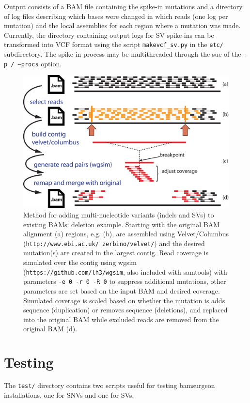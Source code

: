 \documentclass[letterpaper,11pt]{article}
\begin{document}
     Output consists of a BAM file containing the spike-in mutations and a directory of log files describing which bases were changed in which reads (one log per mutation) and the local assemblies for each region where a mutation was made. Currently, the directory containing output logs for SV spike-ins can be transformed into VCF format using the script \texttt {makevcf\_sv.py} in the \texttt {etc/} subdirectory. The spike-in process may be multithreaded through the sue of the \texttt {-p / --procs} option.

\newpage %

\begin{figure}[!h]
\centering
\includegraphics[width=5.5in]{bamsurgeon_sv_del.eps}
\caption{Method for adding multi-nucleotide variants (indels and SVs) to existing BAMs: deletion example. Starting with the original BAM alignment (a) regions, e.g. (b), are assembled using Velvet/Columbus (\texttt{http://www.ebi.ac.uk/~zerbino/velvet/}) and the desired mutation(s) are created in the largest contig. Read coverage is simulated over the contig using wgsim (\texttt{https://github.com/lh3/wgsim}, also included with samtools) with parameters \texttt{-e 0 -r 0 -R 0} to suppress additional mutations, other parameters are set based on the input BAM and desired coverage. Simulated coverage is scaled based on whether the mutation is adds sequence (duplication) or removes sequence (deletions), and replaced into the original BAM while excluded reads are removed from the original BAM (d).}
\end{figure}

\section{Testing}
The \texttt{test/} directory contains two scripts useful for testing bamsurgeon installations, one for SNVs and one for SVs.
\end{document}
